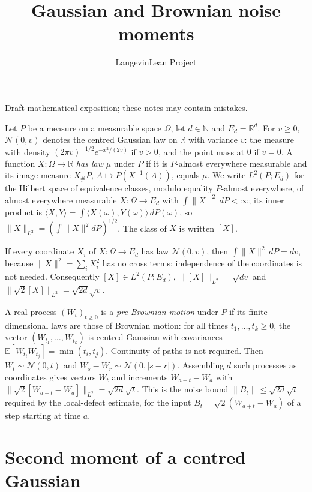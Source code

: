 \documentclass[11pt,a4paper]{article}
\title{\texorpdfstring{Gaussian and Brownian noise moments}{Gaussian and Brownian noise moments}}
\author{LangevinLean Project}
\date{}
\begin{document}
\maketitle
Draft mathematical exposition; these notes may contain mistakes.


Let \(P\) be a measure on a measurable space \(\Omega\), let \(d\in\mathbb N\) and \(E_d=\mathbb R^d\). For \(v\ge0\), \(\mathcal N(0,v)\) denotes the centred Gaussian law on \(\mathbb R\) with variance \(v\): the measure with density \((2\pi v)^{-1/2}e^{-x^2/(2v)}\) if \(v>0\), and the point mass at \(0\) if \(v=0\). A function \(X:\Omega\to\mathbb R\) \emph{has law} \(\mu\) under \(P\) if it is \(P\)-almost everywhere measurable and its image measure \(X_\#P\), \(A\mapsto P(X^{-1}(A))\), equals \(\mu\). We write \(L^2(P;E_d)\) for the Hilbert space of equivalence classes, modulo equality \(P\)-almost everywhere, of almost everywhere measurable \(X:\Omega\to E_d\) with \(\int\|X\|^2\,dP<\infty\); its inner product is \(\langle X,Y\rangle=\int\langle X(\omega),Y(\omega)\rangle\,dP(\omega)\), so \(\|X\|_{L^2}=(\int\|X\|^2dP)^{1/2}\). The class of \(X\) is written \([X]\).




If every coordinate \(X_i\) of \(X:\Omega\to E_d\) has law \(\mathcal N(0,v)\), then \(\int\|X\|^2\,dP=dv\), because \(\|X\|^2=\sum_iX_i^2\) has no cross terms; independence of the coordinates is not needed. Consequently \([X]\in L^2(P;E_d)\), \(\|[X]\|_{L^2}=\sqrt{dv}\) and \(\|\sqrt2[X]\|_{L^2}=\sqrt{2d}\sqrt v\).




A real process \((W_t)_{t\ge0}\) is a \emph{pre-Brownian motion} under \(P\) if its finite-dimensional laws are those of Brownian motion: for all times \(t_1,\dots,t_k\ge0\), the vector \((W_{t_1},\dots,W_{t_k})\) is centred Gaussian with covariances \(\mathbb E[W_{t_i}W_{t_j}]=\min(t_i,t_j)\). Continuity of paths is not required. Then \(W_t\sim\mathcal N(0,t)\) and \(W_s-W_r\sim\mathcal N(0,|s-r|)\). Assembling \(d\) such processes as coordinates gives vectors \(W_t\) and increments \(W_{a+t}-W_a\) with \(\|\sqrt2[W_{a+t}-W_a]\|_{L^2}=\sqrt{2d}\sqrt t\). This is the noise bound \(\|B_t\|\le\sqrt{2d}\sqrt t\) required by the local-defect estimate, for the input \(B_t=\sqrt2(W_{a+t}-W_a)\) of a step starting at time \(a\).


\section{\texorpdfstring{Second moment of a centred Gaussian}{Second moment of a centred Gaussian}}
\end{document}
